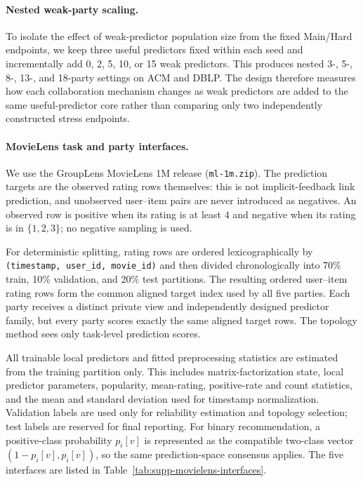 \documentclass[letterpaper]{article}
\begin{document}
\paragraph{Nested weak-party scaling.}
To isolate the effect of weak-predictor population size from the fixed
Main/Hard endpoints, we keep three useful predictors fixed within each seed
and incrementally add 0, 2, 5, 10, or 15 weak predictors. This produces nested
3-, 5-, 8-, 13-, and 18-party settings on ACM and DBLP. The design therefore
measures how each collaboration mechanism changes as weak predictors are added
to the same useful-predictor core rather than comparing only two independently
constructed stress endpoints.

\paragraph{MovieLens task and party interfaces.}
We use the GroupLens MovieLens 1M release (\texttt{ml-1m.zip}). The prediction
targets are the observed rating rows themselves: this is not implicit-feedback
link prediction, and unobserved user--item pairs are never introduced as
negatives. An observed row is positive when its rating is at least $4$ and
negative when its rating is in $\{1,2,3\}$; no negative sampling is used.

For deterministic splitting, rating rows are ordered lexicographically by
\texttt{(timestamp, user\_id, movie\_id)} and then divided chronologically into
70\% train, 10\% validation, and 20\% test partitions. The resulting ordered
user--item rating rows form the common aligned target index used by all five
parties. Each party receives a distinct private view and independently designed
predictor family, but every party scores exactly the same aligned target rows.
The topology method sees only task-level prediction scores.

All trainable local predictors and fitted preprocessing statistics are estimated
from the training partition only. This includes matrix-factorization state,
local predictor parameters, popularity, mean-rating, positive-rate and count
statistics, and the mean and standard deviation used for timestamp
normalization. Validation labels are used only for reliability estimation and
topology selection; test labels are reserved for final reporting. For binary
recommendation, a positive-class probability $p_i[v]$ is represented as the
compatible two-class vector $(1-p_i[v],p_i[v])$, so the same prediction-space
consensus applies. The five interfaces are listed in
Table~\ref{tab:supp-movielens-interfaces}.
\end{document}
